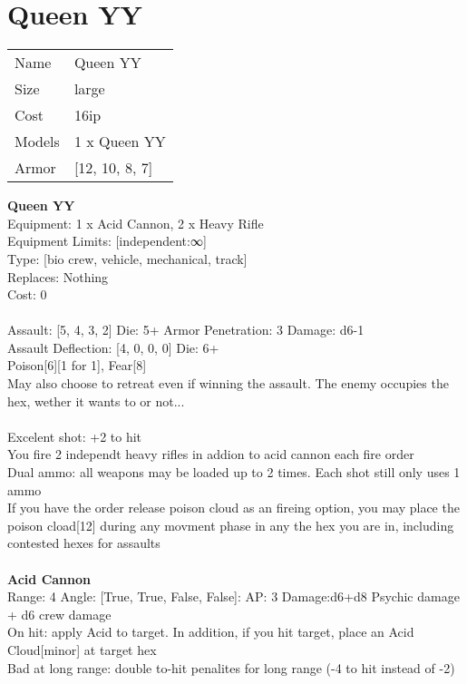 \pagebreak\pagebreak

\section{ Queen YY }

\begin{tabular}{ll}
  Name & Queen YY \\
  Size & large\\
  Cost & 16ip\\
  Models & 1 x Queen YY\\
  Armor & [12, 10, 8, 7]\\
\end{tabular}

\noindent 

{\bf Queen YY } \\
Equipment: 1 x Acid Cannon, 2 x Heavy Rifle \\
Equipment Limits: [independent:∞] \\
Type: [bio crew, vehicle, mechanical, track] \\
Replaces: Nothing \\
Cost: 0\\
\ \\
Assault: [5, 4, 3, 2] Die: 5+ Armor Penetration: 3 Damage: d6-1 \\
Assault Deflection: [4, 0, 0, 0] Die: 6+\\
\indent Poison[6][1 for 1], Fear[8]\\ 
May also choose to retreat even if winning the assault. The enemy occupies the hex, wether it wants to or not...\\ 
 
\ \\
Excelent shot: +2 to hit\\ 
You fire 2 independt heavy rifles in addion to acid cannon each fire order\\ 
Dual ammo: all weapons may be loaded up to 2 times. Each shot still only uses 1 ammo\\ 
If you have the order release poison cloud as an fireing option, you may place the poison cload[12] during any movment phase in any the hex you are in, including contested hexes for assaults\\ 

\ \\
{\bf Acid Cannon } \\



Range: 4  Angle: [True, True, False, False]: AP: 3 Damage:d6+d8 Psychic damage + d6 crew damage \\
On hit: apply Acid to target. In addition, if you hit target, place an Acid Cloud[minor] at target hex\\ 
Bad at long range: double to-hit penalites for long range (-4 to hit instead of -2)\\ 




